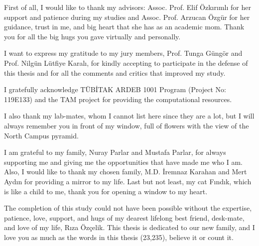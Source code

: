 \begin{acknowledgements}
First of all, I would like to thank my advisors: Assoc. Prof. Elif Özkırımlı for her support and patience during my studies and Assoc. Prof. Arzucan Özgür for her guidance, trust in me, and big heart that she has as an academic mom. Thank you for all the big hugs you gave virtually and personally. 

I want to express my gratitude to my jury members, Prof. Tunga Güngör and Prof. Nilgün Lütfiye Karalı, for kindly accepting to participate in the defense of this thesis and for all the comments and critics that improved my study. 

I gratefully acknowledge TÜBİTAK ARDEB 1001 Program (Project No: 119E133) and the TAM project for providing the computational resources. 

I also thank my lab-mates, whom I cannot list here since they are a lot, but I will always remember you in front of my window, full of flowers with the view of the North Campus pyramid. 

I am grateful to my family, Nuray Parlar and Mustafa Parlar, for always supporting me and giving me the opportunities that have made me who I am. Also, I would like to thank my chosen family, M.D. İremnaz Karahan and Mert Aydın for providing a mirror to my life. Last but not least,  my cat Fındık, which is like a child to me, thank you for opening a window to my heart. 

The completion of this study could not have been possible without the expertise, patience, love, support, and hugs of my dearest lifelong best friend, desk-mate, and love of my life, Rıza Özçelik. This thesis is dedicated to our new family, and I love you as much as the words in this thesis (23,235), believe it or count it.
\end{acknowledgements}